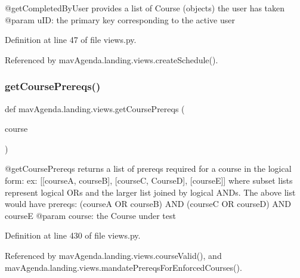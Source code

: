 \begin{DoxyVerb}@getCompletedByUser provides a list of Course (objects) the user has taken
@param uID: the primary key corresponding to the active user
\end{DoxyVerb}
 

Definition at line 47 of file views.\+py.



Referenced by mav\+Agenda.\+landing.\+views.\+create\+Schedule().

\mbox{\label{namespacemavAgenda_1_1landing_1_1views_aea033cb7fd4db6ad8582d9030adbd9eb}} 
\subsubsection{\texorpdfstring{get\+Course\+Prereqs()}{getCoursePrereqs()}}
{\footnotesize\ttfamily def mav\+Agenda.\+landing.\+views.\+get\+Course\+Prereqs (\begin{DoxyParamCaption}\item[{}]{course }\end{DoxyParamCaption})}

\begin{DoxyVerb}@getCoursePrereqs returns a list of prereqs required for a course in the logical form:
    ex: [[courseA, courseB], [courseC, CourseD], [courseE]]
    where subset lists represent logical ORs and the larger list joined by logical ANDs.
    The above list would have prereqs: (courseA OR courseB) AND (courseC OR courseD) AND courseE
@param course: the Course under test
\end{DoxyVerb}
 

Definition at line 430 of file views.\+py.



Referenced by mav\+Agenda.\+landing.\+views.\+course\+Valid(), and mav\+Agenda.\+landing.\+views.\+mandate\+Prereqs\+For\+Enforced\+Courses().

\mbox{\label{namespacemavAgenda_1_1landing_1_1views_acf197252d8fc64ca8dabcd3ad86c44fa}} 
